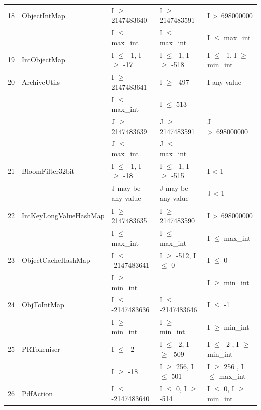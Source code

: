 \documentclass[runningheads,a4paper]{llncs}
\begin{document}
{\begin{longtable}{|l|l|l|l|l|}
18	& ObjectIntMap				& I $\ge$ 2147483640			& I $\ge$ 2147483591			& I \textgreater~698000000					\\ 
	&                                             & I $\le$ max\_int					& I $\le$ max\_int					& I $\le$ max\_int			\\	
19	& IntObjectMap				& I $\le$ -1, I $\ge$ -17			& I $\le$ -1, I $\ge$ -518			& I $\le$ -1, I $\ge$ min\_int\\ 
20	& ArchiveUtils				& I $\ge$ 2147483641			& I $\ge$ -497					& I any value									\\ 
	&							& I $\le$ max\_int					& I $\le$ 513					& 											\\ 
	&                                             & J $\ge$ 2147483639			& J $\ge$ 2147483591			& J \textgreater~698000000 	   				\\
	&                                             & J $\le$ max\_int					&  J $\le$ max\_int				&  	   										\\
21	& BloomFilter32bit 			& I $\le$ -1, I $\ge$ -18			& I $\le$ -1, I $\ge$ -515			& I \textless -1 								\\ 
	&                                             & J may be any value				& J may be any value				& J \textless -1 			   					\\	
22	& IntKeyLongValueHashMap	& I $\ge$ 2147483635			& I $\ge$ 2147483590			& I \textgreater~698000000					\\ 
	&                                             & I $\le$ max\_int					& I $\le$ max\_int					& I $\le$ max\_int			\\	
23	& ObjectCacheHashMap		& I $\le$ -2147483641			& I $\ge$ -512, I $\le$ 0			& I $\le$ 0								\\ 
	&                                             & I $\ge$ min\_int					& 								& I $\ge$ min\_int				\\	
24	& ObjToIntMap				& I $\le$ -2147483636			& I $\le$ -2147483646			& I $\le$ -1								\\ 
	&                                             & I $\ge$ min\_int					& I $\ge$ min\_int				& I $\ge$ min\_int			   	\\	
25	& PRTokeniser				& I $\le$ -2						& I $\le$ -2, I $\ge$ -509			& I $\le$ -2 , I $\ge$ min\_int\\ 
	&                                             & I $\ge$ -18					& I $\ge$ 256, I $\le$ 501		& I $\ge$ 256 , I $\le$ max\_int\\
26	& PdfAction					& I $\le$ -2147483640 			& I $\le$ 0, I $\ge$ -514			& I $\le$ 0, I $\ge$ min\_int 	\\ 

\end{longtable}}
\end{document}
